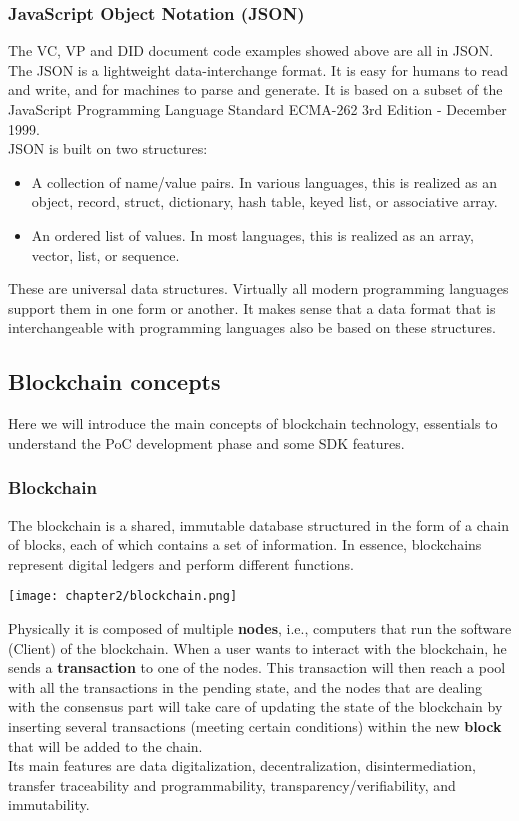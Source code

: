 \subsubsection{JavaScript Object Notation (JSON)}
The VC, VP and DID document code examples showed above are all in JSON.\\
The JSON is a lightweight data-interchange format. It is easy for humans to read and 
write, and for machines to parse and generate. It is based on a subset of the JavaScript
Programming Language Standard ECMA-262 3rd Edition - December 1999.\\
JSON is built on two structures:
\begin{itemize}
    \item A collection of name/value pairs. In various languages, this is realized as an 
    object, record, struct, dictionary, hash table, keyed list, or associative array.
    \item An ordered list of values. In most languages, this is realized as an array, 
    vector, list, or sequence.
\end{itemize}
These are universal data structures. Virtually all modern programming languages support 
them in one form or another. It makes sense that a data format that is interchangeable 
with programming languages also be based on these structures.
\subsection{Blockchain concepts}
Here we will introduce the main concepts of blockchain technology, essentials to 
understand the PoC development phase and some SDK features.
\subsubsection{Blockchain}
The blockchain is a shared, immutable database structured in the form of a chain of 
blocks, each of which contains a set of information. In essence, blockchains represent 
digital ledgers and perform different functions.
\begin{center}
    \texttt{[image: chapter2/blockchain.png]}
\end{center}
Physically it is composed of multiple \textbf{nodes}, i.e., computers that run the software 
(Client) of the blockchain. When a user wants to interact with the blockchain, he 
sends a \textbf{transaction} to one of the nodes. This transaction will then reach a pool with 
all the transactions in the pending state, and the nodes that are dealing with the 
consensus part will take care of updating the state of the blockchain by inserting 
several transactions (meeting certain conditions) within the new \textbf{block} that will
be added to the chain.\\
Its main features are data digitalization, decentralization, disintermediation, 
transfer traceability and programmability, transparency/verifiability, and immutability.
